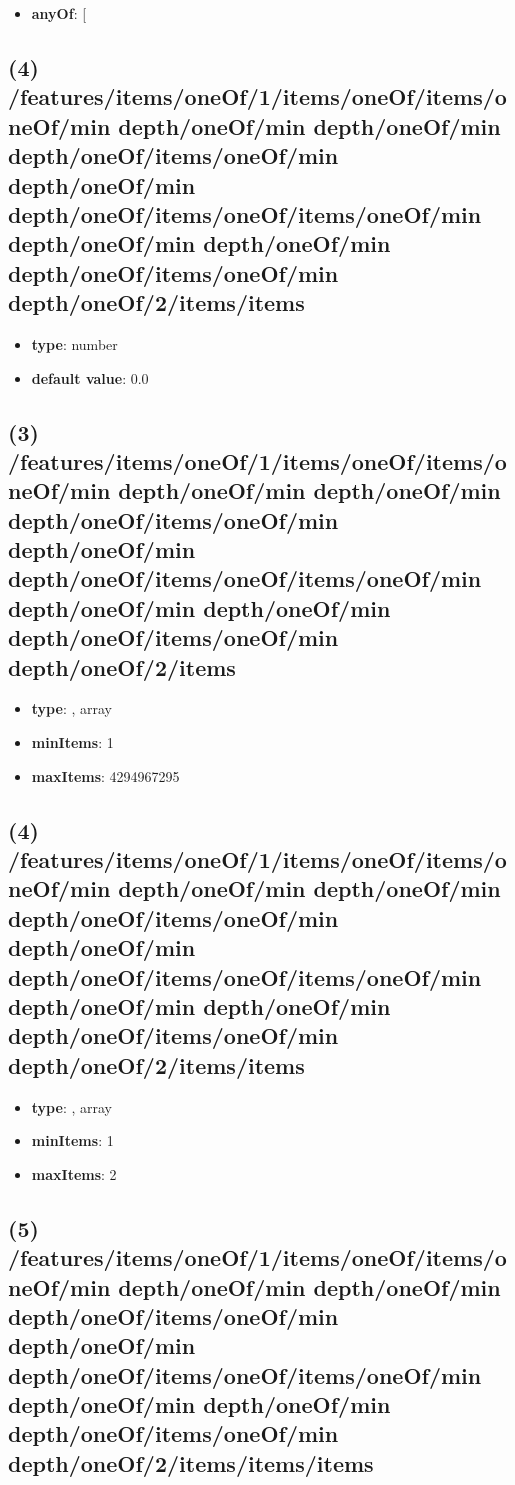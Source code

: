 \begin{itemize}[leftmargin=4em]\item {\bf anyOf}: [\end{itemize}\subsection{(4) /features/items/oneOf/1/items/oneOf/items/oneOf/min depth/oneOf/min depth/oneOf/min depth/oneOf/items/oneOf/min depth/oneOf/min depth/oneOf/items/oneOf/items/oneOf/min depth/oneOf/min depth/oneOf/min depth/oneOf/items/oneOf/min depth/oneOf/2/items/items}
\begin{itemize}[leftmargin=4em]\item {\bf type}: number\item {\bf default value}: 0.0
\end{itemize}\subsection{(3) /features/items/oneOf/1/items/oneOf/items/oneOf/min depth/oneOf/min depth/oneOf/min depth/oneOf/items/oneOf/min depth/oneOf/min depth/oneOf/items/oneOf/items/oneOf/min depth/oneOf/min depth/oneOf/min depth/oneOf/items/oneOf/min depth/oneOf/2/items}
\begin{itemize}[leftmargin=3em]\item {\bf type}: , array\item {\bf minItems}: 1
\item {\bf maxItems}: 4294967295
\end{itemize}\subsection{(4) /features/items/oneOf/1/items/oneOf/items/oneOf/min depth/oneOf/min depth/oneOf/min depth/oneOf/items/oneOf/min depth/oneOf/min depth/oneOf/items/oneOf/items/oneOf/min depth/oneOf/min depth/oneOf/min depth/oneOf/items/oneOf/min depth/oneOf/2/items/items}
\begin{itemize}[leftmargin=4em]\item {\bf type}: , array\item {\bf minItems}: 1
\item {\bf maxItems}: 2
\end{itemize}\subsection{(5) /features/items/oneOf/1/items/oneOf/items/oneOf/min depth/oneOf/min depth/oneOf/min depth/oneOf/items/oneOf/min depth/oneOf/min depth/oneOf/items/oneOf/items/oneOf/min depth/oneOf/min depth/oneOf/min depth/oneOf/items/oneOf/min depth/oneOf/2/items/items/items}

